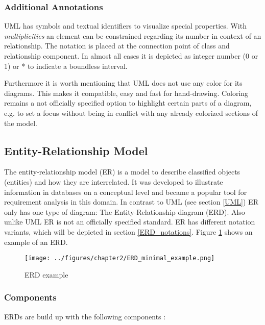 \documentclass[twoside, openright, 12pt]{book}
\begin{document}
\subsubsection{Additional Annotations}
\label{UML_additional_annotations}
UML has symbols and textual identifiers to visualize special properties.
With \textit{multiplicities} an element can be constrained regarding its number in context of an relationship.
The notation is placed at the connection point of class and relationship component.
In almost all cases it is depicted as integer number (0 or 1) or * to indicate a boundless interval.

Furthermore it is worth mentioning that UML does not use any color for its diagrams.
This makes it compatible, easy and fast for hand-drawing.
Coloring remains a not officially specified option to highlight certain parts of a diagram, e.g. to set a focus without being in conflict with any already colorized sections of the model.


\subsection{Entity-Relationship Model}
\label{ER}
The entity-relationship model (ER) is a model to describe classified objects (entities) and how they are interrelated.
It was developed to illustrate information in databases on a conceptual level and became a popular tool for requirement analysis in this domain.
In contrast to UML (see section \ref{UML}) ER only has one type of diagram: The Entity-Relationship diagram (ERD).
Also unlike UML ER is not an officially specified standard.
ER has different notation variants, which will be depicted in section \ref{ERD_notations}.
Figure \ref{fig:ERD_minimal_example} shows an example of an ERD.

\vspace{4mm}
\begin{figure}[htb]
	\centering
	\texttt{[image: ../figures/chapter2/ERD\_minimal\_example.png]}
	\caption{ERD example}
	\label{fig:ERD_minimal_example}
\end{figure}

\subsubsection{Components}
ERDs are build up with the following components \citep{Kleuker11}:
\end{document}
